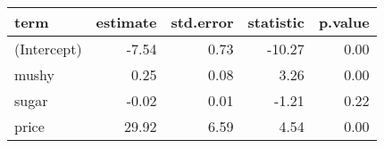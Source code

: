 \begin{tabular}{lrrrr}
  \hline
term & estimate & std.error & statistic & p.value \\ 
  \hline
(Intercept) & -7.54 & 0.73 & -10.27 & 0.00 \\ 
  mushy & 0.25 & 0.08 & 3.26 & 0.00 \\ 
  sugar & -0.02 & 0.01 & -1.21 & 0.22 \\ 
  price & 29.92 & 6.59 & 4.54 & 0.00 \\ 
   \hline
\end{tabular}
